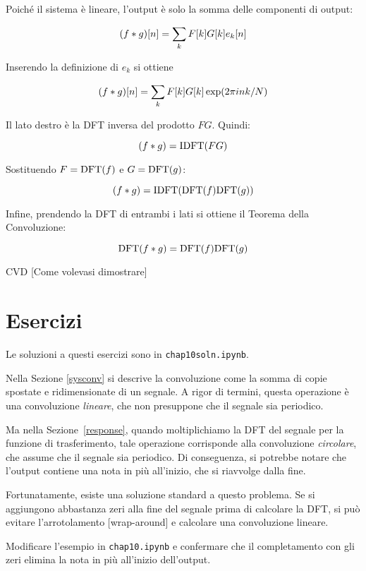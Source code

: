 \documentclass[12pt,a4paper]{book}
\begin{document}
Poiché il sistema è lineare, l'output è solo la somma delle componenti di output:

%
\[ (f \ast g)[n] = \sum_k F[k] G[k] e_k[n] \] 

%
Inserendo la definizione di $e_k$ si ottiene

%
\[ (f \ast g)[n] = \sum_k F[k] G[k] \exp(2 \pi i n k / N) \] 

%
Il lato destro è la DFT inversa del prodotto $F G$. Quindi:

%
\[ (f \ast g) = \mathrm{IDFT}( F G ) \] 

%
Sostituendo $F = \mathrm{DFT}(f)$ e $G = \mathrm{DFT}(g)$:

%
\[ (f \ast g) = \mathrm{IDFT}( \mathrm{DFT}(f) \mathrm{DFT}(g) ) \] 

%
Infine, prendendo la DFT di entrambi i lati si ottiene il Teorema della Convoluzione:

%
\[ \mathrm{DFT}(f \ast g) = \mathrm{DFT}(f) \mathrm{DFT}(g) \] 

%
CVD [Come volevasi dimostrare]

\section{Esercizi} 

Le soluzioni a questi esercizi sono in {\tt chap10soln.ipynb}.

\begin{exercise} Nella Sezione \ref{sysconv} si descrive la convoluzione come la somma di copie spostate e ridimensionate di un segnale. A rigor di termini, questa operazione è una convoluzione {\em lineare}, che non presuppone che il segnale sia periodico.

Ma nella Sezione~\ref{response}, quando moltiplichiamo la DFT del segnale per la funzione di trasferimento, tale operazione corrisponde alla convoluzione {\em circolare}, che assume che il segnale sia periodico. Di conseguenza, si potrebbe notare che l'output contiene una nota in più all'inizio, che si riavvolge dalla fine.

Fortunatamente, esiste una soluzione standard a questo problema. Se si aggiungono abbastanza zeri alla fine del segnale prima di calcolare la DFT, si può evitare l'arrotolamento [wrap-around] e calcolare una convoluzione lineare.

Modificare l'esempio in {\tt chap10.ipynb} e confermare che il completamento con gli zeri elimina la nota in più all'inizio dell'output. \end{exercise} 
\end{document}

